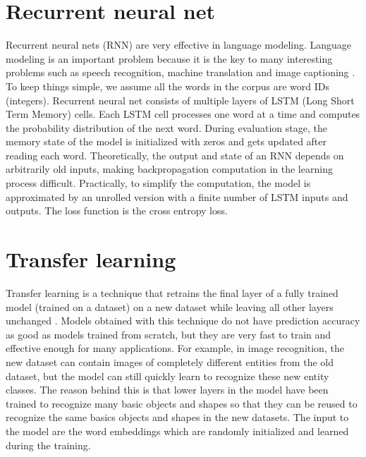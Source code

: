 \documentclass[12pt]{WSUThesis}
\theoremstyle{definition}
\begin{document}
\section{Recurrent neural net}
Recurrent neural nets (RNN) are very effective in language modeling.
Language modeling is an important problem because it is the key to many interesting problems such as speech recognition, machine translation and image captioning \cite{zaremba2014recurrent}.
To keep things simple, we assume all the words in the corpus are word IDs (integers).
Recurrent neural net consists of multiple layers of LSTM (Long Short Term Memory) cells. Each LSTM cell processes one word at a time and computes the probability distribution of the next word.
During evaluation stage, the memory state of the model is initialized with zeros and gets updated after reading each word.
Theoretically, the output and state of an RNN depends on arbitrarily old inputs, making backpropagation computation in the learning process difficult.
Practically, to simplify the computation, the model is approximated by an unrolled version with a finite number of LSTM inputs and outputs.
The loss function is the cross entropy loss.

\section{Transfer learning}
Transfer learning is a technique that retrains the final layer of a fully trained model (trained on a dataset) on a new dataset while leaving all other layers unchanged \cite{donahue2014decaf}. Models obtained with this technique do not have prediction accuracy as good as models trained from scratch, but they are very fast to train and effective enough for many applications. For example, in image recognition, the new dataset can contain images of completely different entities from the old dataset, but the model can still quickly learn to recognize these new entity classes. The reason behind this is that lower layers in the model have been trained to recognize many basic objects and shapes so that they can be reused to recognize the same basics objects and shapes in the new datasets.
The input to the model are the word embeddings which are randomly initialized and learned during the training.
\end{document}
